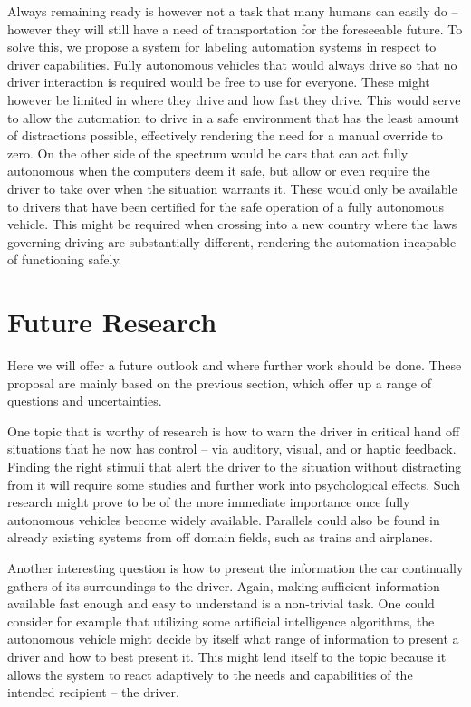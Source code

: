 \documentclass{acm_proc_article-sp}
\begin{document}
Always remaining ready is however not a task that many humans can easily do – however they will still have a need of transportation for the foreseeable future.
To solve this, we propose a system for labeling automation systems in respect to driver capabilities.
Fully autonomous vehicles that would always drive so that no driver interaction is required would be free to use for everyone.
These might however be limited in where they drive and how fast they drive.
This would serve to allow the automation to drive in a safe environment that has the least amount of distractions possible, effectively rendering the need for a manual override to zero.
On the other side of the spectrum would be cars that can act fully autonomous when the computers deem it safe, but allow or even require the driver to take over when the situation warrants it.
These would only be available to drivers that have been certified for the safe operation of a fully autonomous vehicle.
This might be required when crossing into a new country where the laws governing driving are substantially different, rendering the automation incapable of functioning safely.

\section{Future Research}

Here we will offer a future outlook and where further work should be done.
These proposal are mainly based on the previous section, which offer up a range of questions and uncertainties.

One topic that is worthy of research is how to warn the driver in critical hand off situations that he now has control – via auditory, visual, and or haptic feedback.
Finding the right stimuli that alert the driver to the situation without distracting from it will require some studies and further work into psychological effects.
Such research might prove to be of the more immediate importance once fully autonomous vehicles become widely available.
Parallels could also be found in already existing systems from off domain fields, such as trains and airplanes.

Another interesting question is how to present the information the car continually gathers of its surroundings to the driver.
Again, making sufficient information available fast enough and easy to understand is a non-trivial task.
One could consider for example that utilizing some artificial intelligence algorithms, the autonomous vehicle might decide by itself what range of information to present a driver and how to best present it.
This might lend itself to the topic because it allows the system to react adaptively to the needs and capabilities of the intended recipient – the driver.
\end{document}
